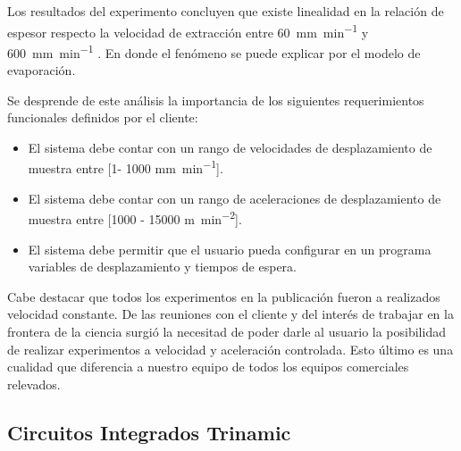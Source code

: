 Los resultados del experimento concluyen  que existe linealidad  en la relación de espesor respecto la velocidad de extracción entre \SI{60}{\milli\meter\per\minute} y \SI{600}{\milli\meter\per\minute} . En donde el fenómeno se puede explicar por el modelo de evaporación.

Se desprende de este análisis la importancia de los siguientes requerimientos funcionales definidos por el cliente: 

\begin{itemize}
\item El sistema debe contar con un rango de velocidades de desplazamiento de muestra entre [1- 1000 \si{\milli\meter\per\minute}]. 
\item El sistema debe contar con un rango de aceleraciones de desplazamiento de muestra entre [1000 - 15000 \si{\meter\per\square\minute}].
\item El sistema debe permitir que el usuario pueda configurar en un programa variables de desplazamiento y tiempos de espera.		
\end{itemize}
	
Cabe destacar que todos los experimentos en la publicación fueron a realizados velocidad constante. De las reuniones con el cliente y del interés de trabajar en la frontera de la ciencia surgió la necesitad de poder darle al usuario la posibilidad de realizar experimentos a velocidad y aceleración controlada. Esto último es una cualidad que diferencia a nuestro equipo de todos los equipos comerciales relevados.

 


\subsection{Circuitos Integrados Trinamic}

